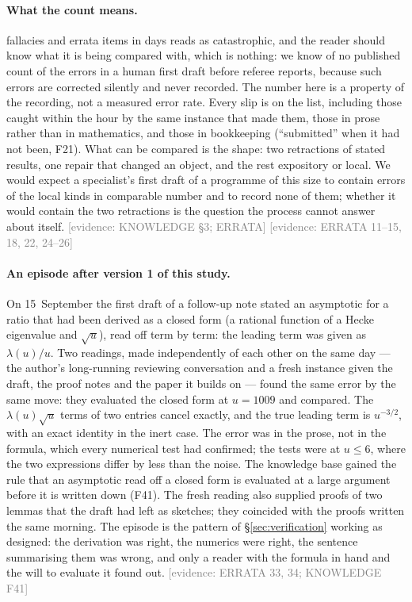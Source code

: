 \documentclass[11pt,a4paper]{article}
\newcommand{\evidence}[1]{{\footnotesize\textcolor{Gray}{[evidence: #1]}}}
\begin{document}
\paragraph{What the count means.} \NFallacies{} fallacies and \NErrata{} errata items in \NDays{} days reads as
catastrophic, and the reader should know what it is being compared with, which is nothing: we know of no published
count of the errors in a human first draft before referee reports, because such errors are corrected silently and
never recorded. The number here is a property of the recording, not a measured error rate. Every slip is on the
list, including those caught within the hour by the same instance that made them, those in prose rather than in
mathematics, and those in bookkeeping (``submitted'' when it had not been, F21). What can be compared is the shape:
two retractions of stated results, one repair that changed an object, and the rest expository or local. We would
expect a specialist's first draft of a programme of this size to contain errors of the local kinds in comparable
number and to record none of them; whether it would contain the two retractions is the question the process cannot
answer about itself. \evidence{KNOWLEDGE \S3; ERRATA} \evidence{ERRATA 11--15, 18, 22, 24--26}

\paragraph{An episode after version 1 of this study.} On 15~September the first draft of a follow-up note stated an
asymptotic for a ratio that had been derived as a closed form (a rational function of a Hecke eigenvalue and $\sqrt u$),
read off term by term: the leading term was given as $\lambda(u)/u$. Two readings, made independently of each other on the
same day --- the author's long-running reviewing conversation and a fresh instance given the draft, the proof notes and
the paper it builds on --- found the same error by the same move: they evaluated the closed form at $u=1009$ and compared.
The $\lambda(u)\sqrt u$ terms of two entries cancel exactly, and the true leading term is $u^{-3/2}$, with an exact identity
in the inert case. The error was in the prose, not in the formula, which every numerical test had confirmed; the tests were
at $u\le6$, where the two expressions differ by less than the noise. The knowledge base gained the rule that an asymptotic
read off a closed form is evaluated at a large argument before it is written down (F41). The fresh reading also supplied
proofs of two lemmas that the draft had left as sketches; they coincided with the proofs written the same morning.
The episode is the pattern of \S\ref{sec:verification} working as designed: the derivation was right, the numerics were
right, the sentence summarising them was wrong, and only a reader with the formula in hand and the will to evaluate it
found out. \evidence{ERRATA 33, 34; KNOWLEDGE F41}
\end{document}
